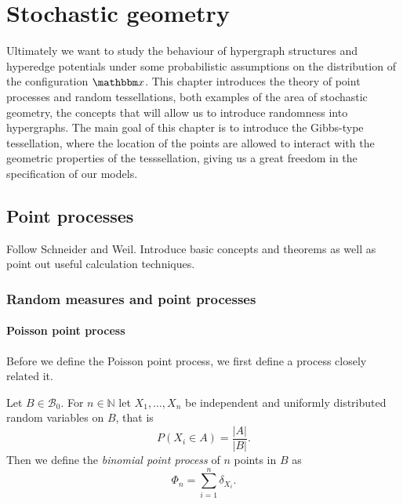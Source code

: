 \chapter{Stochastic geometry}
Ultimately we want to study the behaviour of hypergraph structures and hyperedge potentials under some probabilistic assumptions on the distribution of the configuration $\x$. This chapter introduces the theory of point processes and random tessellations, both examples of the area of stochastic geometry, the concepts that will allow us to introduce randomness into hypergraphs. The main goal of this chapter is to introduce the Gibbs-type tessellation, where the location of the points are allowed to interact with the geometric properties of the tesssellation, giving us a great freedom in the specification of our models.

\section{Point processes}

Follow Schneider and Weil. Introduce basic concepts and theorems as well as point out useful calculation techniques.

\subsection{Random measures and point processes}

\subsubsection{Poisson point process}
Before we define the Poisson point process, we first define a process closely related it.

\begin{definition} Let $B \in \mathcal B_0$. For $n\in \mathbb N$ let $X_1,\dots,X_n$ be independent and uniformly distributed random variables on $B$, that is
$$P(X_i \in A) = \frac{|A|}{|B|}.$$
Then we define the \textit{binomial point process} of $n$ points in $B$ as
$$\Phi_n = \sum^{n}_{i=1}  \delta_{X_i}.$$
\end{definition}

